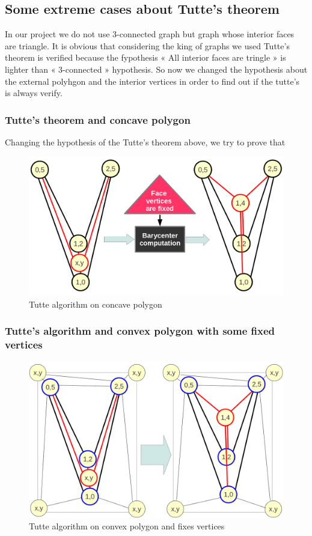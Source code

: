 \subsection{Some extreme cases about Tutte's theorem}
In our project we do not use 3-connected graph but graph whose interior faces are triangle. It is obvious that considering the king of graphs we used Tutte's theorem is verified because the fypothesis « All interior faces are tringle » is lighter than « 3-connected » hypothesis. So now we changed the hypothesis about the external polyhgon and the interior vertices in order to find out if the tutte's  is always verify.  

\subsubsection{Tutte's theorem and concave polygon}
Changing the hypothesis of the Tutte's theorem above, we try to prove that 

\begin {figure}[H]
  \centering
  \includegraphics[scale=0.3]{img/tutte2.png}
  \caption{Tutte algorithm on concave polygon}
  \label{struct3}
\end {figure}

\subsubsection{Tutte's algorithm and convex polygon with some fixed vertices}


\begin {figure}[H]
  \centering
  \includegraphics[scale=0.3]{img/tutte3.png}
  \caption{Tutte algorithm on convex polygon and fixes vertices}
  \label{struct3}
\end {figure}
